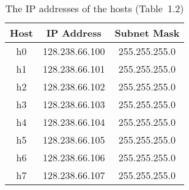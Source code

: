 \documentclass{../UTNetLab}
\begin{document}
\begin{center}
    \begin{minipage}{0.48\textwidth}
        \begin{flushleft}
            \begin{table}[H]
                \caption{The IP addresses of the hosts (Table~1.2)}
                \centering
                \begin{tabular}{ c c c }
                    \hline \hline
                    Host & IP Address     & Subnet Mask   \\
                    \hline
                    h0   & 128.238.66.100 & 255.255.255.0 \\
                    h1   & 128.238.66.101 & 255.255.255.0 \\
                    h2   & 128.238.66.102 & 255.255.255.0 \\
                    h3   & 128.238.66.103 & 255.255.255.0 \\
                    h4   & 128.238.66.104 & 255.255.255.0 \\
                    h5   & 128.238.66.105 & 255.255.255.0 \\
                    h6   & 128.238.66.106 & 255.255.255.0 \\
                    h7   & 128.238.66.107 & 255.255.255.0 \\
                    \hline \hline
                \end{tabular}
            \end{table}
        \end{flushleft}
    \end{minipage}
    \begin{minipage}{0.48\textwidth}
        \begin{flushright}
            \begin{figure}[H]
                \centering
\end{figure}
\end{flushright}
\end{minipage}
\end{center}
\end{document}
